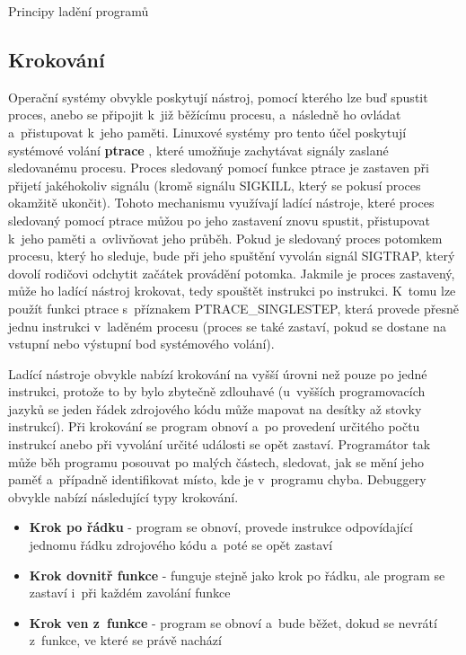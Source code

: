 \documentclass[czech,bachelor,male,python,dept460,hidelinks]{diploma}						%
\newcommand{\parspace}[1][]{
	\ifthenelse{\isempty{#1}}{\vspace{0mm}}{\vspace{#1}}
	\par
}
\begin{document}
\begin{section}{Principy ladění programů}
	\subsection{Krokování}
		Operační systémy obvykle poskytují nástroj, pomocí kterého lze buď spustit proces, anebo se připojit k~již běžícímu procesu, a~následně ho ovládat
		a~přistupovat k~jeho paměti. Linuxové systémy pro tento účel poskytují systémové volání \textbf{ptrace} \cite{ptrace},
		které umožňuje zachytávat signály zaslané sledovanému procesu. Proces sledovaný pomocí funkce ptrace je zastaven při přijetí jakéhokoliv signálu
		(kromě signálu SIGKILL, který se pokusí proces okamžitě ukončit). Tohoto mechanismu využívají ladící nástroje, které proces sledovaný pomocí
		ptrace můžou po jeho zastavení znovu spustit, přistupovat k~jeho paměti a~ovlivňovat jeho průběh. Pokud je sledovaný proces potomkem procesu,
		který ho sleduje, bude při jeho spuštění vyvolán signál SIGTRAP, který dovolí rodičovi odchytit začátek provádění potomka. Jakmile je proces
		zastavený, může ho ladící nástroj krokovat, tedy spouštět instrukci po instrukci. K~tomu lze použít funkci ptrace s~příznakem PTRACE\_SINGLESTEP,
		která provede přesně jednu instrukci v~laděném procesu (proces se také zastaví, pokud se dostane na vstupní nebo výstupní bod systémového volání).
		
		\parspace Ladící nástroje obvykle nabízí krokování na vyšší úrovni než pouze po jedné instrukci, protože to by bylo zbytečně zdlouhavé (u~vyšších
		programovacích jazyků se jeden řádek zdrojového kódu může mapovat na desítky až stovky instrukcí).
		Při krokování se program obnoví a~po provedení určitého počtu instrukcí anebo při vyvolání určité události se opět zastaví. Programátor tak může
		běh programu posouvat po malých částech, sledovat, jak se mění jeho paměť a~případně identifikovat místo, kde je v~programu chyba.
		Debuggery obvykle nabízí následující typy krokování.
		
		\begin{itemize}
			\item \textbf{Krok po řádku} - program se obnoví, provede instrukce odpovídající jednomu řádku zdrojového kódu a~poté se opět zastaví
			\item \textbf{Krok dovnitř funkce} - funguje stejně jako krok po řádku, ale program se zastaví i~při každém zavolání funkce
			\item \textbf{Krok ven z~funkce} - program se obnoví a~bude běžet, dokud se nevrátí z~funkce, ve které se právě nachází
		\end{itemize}
		

\end{section}
\end{document}
